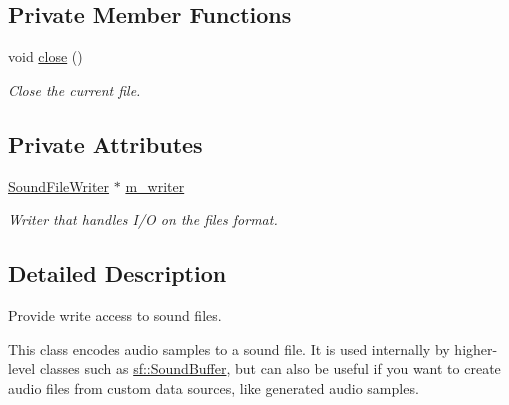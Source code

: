 \subsection*{Private Member Functions}
\begin{DoxyCompactItemize}
\item 
void \mbox{\hyperlink{classsf_1_1_output_sound_file_ad20c867d7e565d533da029f31ea5a337}{close}} ()
\begin{DoxyCompactList}\small\item\em Close the current file. \end{DoxyCompactList}\end{DoxyCompactItemize}
\subsection*{Private Attributes}
\begin{DoxyCompactItemize}
\item 
\mbox{\label{classsf_1_1_output_sound_file_a0db66c6deffbbcbe3522750dbaae028e}} 
\mbox{\hyperlink{classsf_1_1_sound_file_writer}{Sound\+File\+Writer}} $\ast$ \mbox{\hyperlink{classsf_1_1_output_sound_file_a0db66c6deffbbcbe3522750dbaae028e}{m\+\_\+writer}}
\begin{DoxyCompactList}\small\item\em Writer that handles I/O on the file\textquotesingle{}s format. \end{DoxyCompactList}\end{DoxyCompactItemize}


\subsection{Detailed Description}
Provide write access to sound files. 

\begin{DoxyVerb}\end{DoxyVerb}


This class encodes audio samples to a sound file. It is used internally by higher-\/level classes such as \mbox{\hyperlink{classsf_1_1_sound_buffer}{sf\+::\+Sound\+Buffer}}, but can also be useful if you want to create audio files from custom data sources, like generated audio samples.

